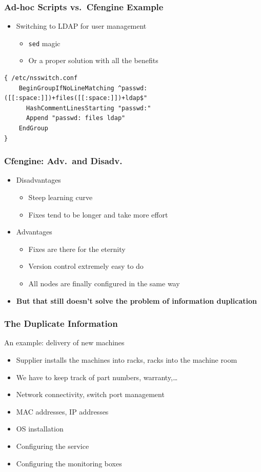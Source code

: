 \documentclass{beamer}
\begin{document}
\begin{frame}[fragile]
\frametitle{Ad-hoc Scripts vs.\ Cfengine Example}
\begin{itemize}
    \item Switching to LDAP for user management
        \begin{itemize}
            \item {\tt sed} magic
            \item Or a proper solution with all the benefits
        \end{itemize}
\end{itemize}

{\scriptsize
\begin{verbatim}
{ /etc/nsswitch.conf
    BeginGroupIfNoLineMatching ^passwd:([[:space:]])+files([[:space:]])+ldap$"
      HashCommentLinesStarting "passwd:"
      Append "passwd: files ldap"
    EndGroup
}
\end{verbatim}
}
\end{frame}

\begin{frame}[fragile]
\frametitle{Cfengine: Adv.\ and Disadv.}
\begin{itemize}
    \item Disadvantages
        \begin{itemize}
            \item Steep learning curve
            \item Fixes tend to be longer and take more effort
        \end{itemize}
    \item Advantages
        \begin{itemize}
            \item Fixes are there for the eternity
            \item Version control extremely easy to do
            \item All nodes are finally configured in the same way
        \end{itemize}
    \item \textbf{But that still doesn't solve the problem of information duplication}
\end{itemize}
\end{frame}

\begin{frame}[fragile]
\frametitle{The Duplicate Information}
    An example: delivery of new machines
\begin{itemize}
    \item Supplier installs the machines into racks, racks into the machine room
    \item We have to keep track of part numbers, warranty,\ldots
    \item Network connectivity, switch port management
    \item MAC addresses, IP addresses
    \item OS installation
    \item Configuring the service
    \item Configuring the monitoring boxes
\end{itemize}
\end{frame}
\end{document}

